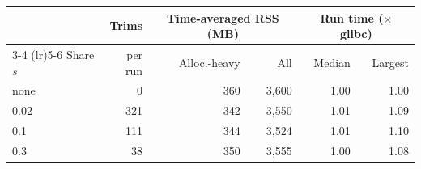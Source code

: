 \begin{tabular}{lrrrrr}
\toprule
 & Trims & \multicolumn{2}{c}{Time-averaged RSS (MB)} & \multicolumn{2}{c}{Run time ($\times$ glibc)} \\
\cmidrule(lr){3-4} \cmidrule(lr){5-6}
Share $s$ & per run & Alloc.-heavy & All & Median & Largest \\
\midrule
none & 0 & 360 & 3{,}600 & 1.00 & 1.00 \\
0.02 & 321 & 342 & 3{,}550 & 1.01 & 1.09 \\
0.1 & 111 & 344 & 3{,}524 & 1.01 & 1.10 \\
0.3 & 38 & 350 & 3{,}555 & 1.00 & 1.08 \\
\bottomrule
\end{tabular}
